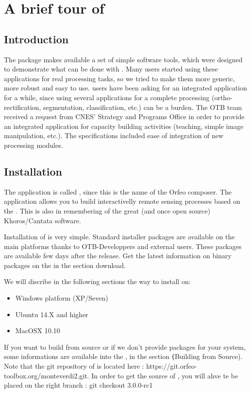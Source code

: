 \chapter{A brief tour of \mont}\label{chap:Monteverdi} 

\section{Introduction}\label{sec:montintro}
The \app package makes available a set of simple software
tools, which were designed to demonstrate what can be done with
\otb. Many users started using these applications for real processing
tasks, so we tried to make them more generic, more robust and easy to
use. \otb users have been asking for an integrated application for a
while, since using several applications for a complete processing
(ortho-rectification, segmentation, classification, etc.) can be a
burden. The OTB team received a request from CNES' Strategy
and Programs Office in order to provide an integrated application for
capacity building activities (teaching, simple image manipulation,
etc.). The specifications included ease of integration of new
processing modules.  


\section{Installation}\label{sec:montinstall}

The application is called \mont, since this is the name of the Orfeo
composer. The application allows you to build interactivelly remote
sensing processes based on the \otb. This is also in
remembering of the great (and once open source) Khoros/Cantata
software.
  
Installation of \mont is very simple. Standard installer packages are available on the main platforms thanks to OTB-Developpers and external users. 
These packages are available few days after the release. Get the latest information on binary packages on the \website in the section download.

We will discribe in the following sections the way to install \mont on:
\begin{itemize}
\item Windows platform (XP/Seven)
\item Ubuntu 14.X and higher
\item MacOSX 10.10
\end{itemize}

If you want to build from source or if we don't provide packages for your system, some informations are available into the \sg, in the section \textbf(Building from Source).
Note that the git repository of \mont is located here : https://git.orfeo-toolbox.org/monteverdi2.git.
In order to get the source of \mont, you will ahve te be placed on the right branch : git checkout 3.0.0-rc1


